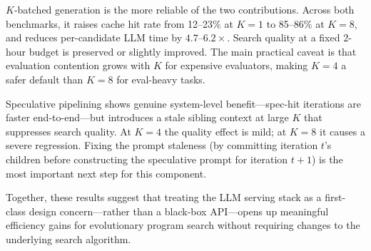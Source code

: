\documentclass{article}
\begin{document}
$K$-batched generation is the more reliable of the two contributions.
Across both benchmarks, it raises cache hit rate from 12--23\% at
$K{=}1$ to 85--86\% at $K{=}8$, and reduces per-candidate LLM time by
$4.7$--$6.2\times$. Search quality at a fixed 2-hour budget is
preserved or slightly improved. The main practical caveat is that
evaluation contention grows with $K$ for expensive evaluators, making
$K{=}4$ a safer default than $K{=}8$ for eval-heavy tasks.

Speculative pipelining shows genuine system-level benefit---spec-hit
iterations are faster end-to-end---but introduces a stale sibling
context at large $K$ that suppresses search quality. At $K{=}4$ the
quality effect is mild; at $K{=}8$ it causes a severe regression.
Fixing the prompt staleness (by committing iteration $t$'s children
before constructing the speculative prompt for iteration $t{+}1$) is
the most important next step for this component.

Together, these results suggest that treating the LLM serving stack as
a first-class design concern---rather than a black-box API---opens up
meaningful efficiency gains for evolutionary program search without
requiring changes to the underlying search algorithm.
\end{document}
